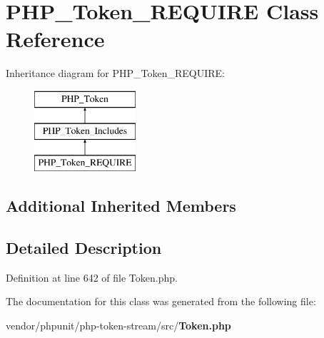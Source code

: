 \section{P\+H\+P\+\_\+\+Token\+\_\+\+R\+E\+Q\+U\+I\+R\+E Class Reference}
\label{class_p_h_p___token___r_e_q_u_i_r_e}
Inheritance diagram for P\+H\+P\+\_\+\+Token\+\_\+\+R\+E\+Q\+U\+I\+R\+E\+:\begin{figure}[H]
\begin{center}
\leavevmode
\includegraphics[height=3.000000cm]{class_p_h_p___token___r_e_q_u_i_r_e}
\end{center}
\end{figure}
\subsection*{Additional Inherited Members}


\subsection{Detailed Description}


Definition at line 642 of file Token.\+php.



The documentation for this class was generated from the following file\+:\begin{DoxyCompactItemize}
\item 
vendor/phpunit/php-\/token-\/stream/src/{\bf Token.\+php}\end{DoxyCompactItemize}

